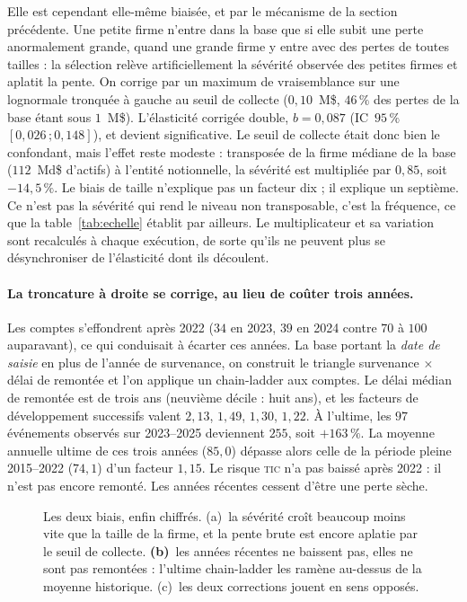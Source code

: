 Elle est cependant elle-même biaisée, et par le mécanisme de la section précédente. Une
petite firme n'entre dans la base que si elle subit une perte anormalement grande, quand une
grande firme y entre avec des pertes de toutes tailles : la sélection relève artificiellement
la sévérité observée des petites firmes et aplatit la pente. On corrige par un
maximum de vraisemblance sur une lognormale tronquée à gauche au seuil de collecte
($0{,}10$~M\$, $46\,\%$ des pertes de la base étant sous $1$~M\$). L'élasticité corrigée
double, $b=0{,}087$ (IC~$95\,\%$ $[0{,}026\,;0{,}148]$), et devient significative. Le seuil de
collecte était donc bien le confondant, mais l'effet reste modeste : transposée de la
firme médiane de la base ($112$~Md\$ d'actifs) à l'entité notionnelle, la sévérité est
multipliée par $0{,}85$, soit $-14{,}5\,\%$. Le biais de taille n'explique pas un facteur dix ; il
explique un septième. Ce n'est pas la sévérité qui rend le niveau non transposable,
c'est la fréquence, ce que la table~\ref{tab:echelle} établit par ailleurs. Le multiplicateur
et sa variation sont recalculés à chaque exécution, de sorte qu'ils ne peuvent plus se
désynchroniser de l'élasticité dont ils découlent.

\paragraph{La troncature à droite se corrige, au lieu de coûter trois années.} Les comptes
s'effondrent après 2022 ($34$ en 2023, $39$ en 2024 contre $70$ à $100$ auparavant), ce qui
conduisait à écarter ces années. La base portant la \emph{date de saisie} en plus de l'année
de survenance, on construit le triangle survenance $\times$ délai de remontée et l'on applique
un chain-ladder aux comptes. Le délai médian de remontée est de trois ans
(neuvième décile : huit ans), et les facteurs de développement successifs valent $2{,}13$,
$1{,}49$, $1{,}30$, $1{,}22$. À l'ultime, les $97$ événements observés sur 2023--2025
deviennent $255$, soit $+163\,\%$. La moyenne annuelle ultime de ces trois années
($85{,}0$) dépasse alors celle de la période pleine 2015--2022 ($74{,}1$) d'un facteur
$1{,}15$. Le risque \textsc{tic} n'a pas baissé après 2022 : il n'est pas encore
remonté. Les années récentes cessent d'être une perte sèche.

\begin{figure}[htbp]\centering
{}
\caption{Les deux biais, enfin chiffrés. (a)~la sévérité croît beaucoup moins vite
que la taille de la firme, et la pente brute est encore aplatie par le seuil de collecte.
\textbf{(b)}~les années récentes ne baissent pas, elles ne sont pas remontées : l'ultime
chain-ladder les ramène au-dessus de la moyenne historique. (c)~les deux corrections
jouent en sens opposés.}
\label{fig:biais}
\end{figure}

